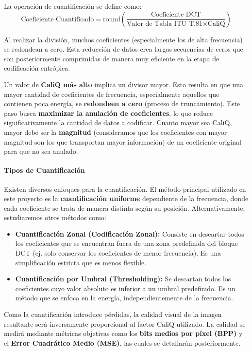 \documentclass[a4paper, 12pt]{article}
\begin{document}
La operación de cuantificación se define como:
\begin{equation}
\text{Coeficiente Cuantificado} = \text{round}\left( \frac{\text{Coeficiente DCT}}{\text{Valor de Tabla ITU T.81} \times \text{CaliQ}} \right)
\end{equation}

Al realizar la división, muchos coeficientes (especialmente los de alta frecuencia) se redondean a cero. Esta reducción de datos crea largas secuencias de ceros que son posteriormente comprimidas de manera muy eficiente en la etapa de codificación entrópica.

Un valor de \textbf{CaliQ más alto} implica un divisor mayor. Esto resulta en que una mayor cantidad de coeficientes de frecuencia, especialmente aquellos que contienen poca energía, se \textbf{redondeen a cero} (proceso de truncamiento). Este paso busca \textbf{maximizar la anulación de coeficientes}, lo que reduce significativamente la cantidad de datos a codificar. Cuanto mayor sea CaliQ, mayor debe ser la \textbf{magnitud} (consideramos que los coeficientes con mayor magnitud son los que transportan mayor información) de un coeficiente original para que no sea anulado.

\paragraph{Tipos de Cuantificación}
Existen diversos enfoques para la cuantificación. El método principal utilizado en este proyecto es la \textbf{cuantificación uniforme} dependiente de la frecuencia, donde cada coeficiente se trata de manera distinta según su posición. Alternativamente, estudiaremos otros métodos como:

\begin{itemize}
    \item \textbf{Cuantificación Zonal (Codificación Zonal):} Consiste en descartar todos los coeficientes que se encuentran fuera de una zona predefinida del bloque DCT (ej. solo conservar los coeficientes de menor frecuencia). Es una simplificación estricta que es menos flexible.
    \item \textbf{Cuantificación por Umbral (Thresholding):} Se descartan todos los coeficientes cuyo valor absoluto es inferior a un umbral predefinido. Es un método que se enfoca en la energía, independientemente de la frecuencia.
\end{itemize}

Como la cuantificación introduce pérdidas, la calidad visual de la imagen resultante será inversamente proporcional al factor $\text{CaliQ}$ utilizado. La calidad se medirá mediante métricas objetivas como los \textbf{bits medios por píxel (BPP)} y el \textbf{Error Cuadrático Medio (MSE)}, las cuales se detallarán posteriormente.
\end{document}
